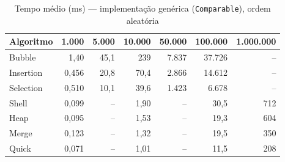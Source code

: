 \begin{table}[htbp]\centering\small
\caption{Tempo médio (ms) — implementação genérica (\texttt{Comparable}), ordem aleatória}\label{tab:gen-aleat}
\setlength{\tabcolsep}{4pt}
\begin{tabular}{lrrrrrr}
\toprule
Algoritmo & 1.000 & 5.000 & 10.000 & 50.000 & 100.000 & 1.000.000 \\
\midrule
Bubble & 1,40 & 45,1 & 239 & 7.837 & 37.726 & -- \\
Insertion & 0,456 & 20,8 & 70,4 & 2.866 & 14.612 & -- \\
Selection & 0,510 & 10,1 & 39,6 & 1.423 & 6.678 & -- \\
Shell & 0,099 & -- & 1,90 & -- & 30,5 & 712 \\
Heap & 0,095 & -- & 1,53 & -- & 19,3 & 604 \\
Merge & 0,123 & -- & 1,32 & -- & 19,5 & 350 \\
Quick & 0,071 & -- & 1,01 & -- & 11,5 & 208 \\
\bottomrule
\end{tabular}
\end{table}